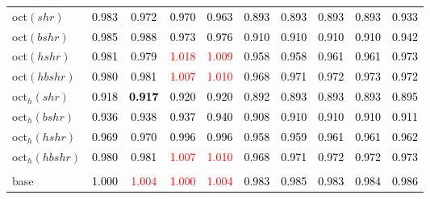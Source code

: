 \begin{tabular}[t]{>{\centering\arraybackslash}m{2.5cm}ccccccccc}
oct$(shr)$ & \textcolor{black}{0.983} & \textcolor{black}{0.972} & \textcolor{black}{0.970} & \textcolor{black}{0.963} & \textcolor{black}{0.893} & \textcolor{black}{0.893} & \textcolor{black}{0.893} & \textcolor{black}{0.893} & \textcolor{black}{0.933}\\
oct$(bshr)$ & \textcolor{black}{0.985} & \textcolor{black}{0.988} & \textcolor{black}{0.973} & \textcolor{black}{0.976} & \textcolor{black}{0.910} & \textcolor{black}{0.910} & \textcolor{black}{0.910} & \textcolor{black}{0.910} & \textcolor{black}{0.942}\\
oct$(hshr)$ & \textcolor{black}{0.981} & \textcolor{black}{0.979} & \textcolor{red}{1.018} & \textcolor{red}{1.009} & \textcolor{black}{0.958} & \textcolor{black}{0.958} & \textcolor{black}{0.961} & \textcolor{black}{0.961} & \textcolor{black}{0.973}\\
oct$(hbshr)$ & \textcolor{black}{0.980} & \textcolor{black}{0.981} & \textcolor{red}{1.007} & \textcolor{red}{1.010} & \textcolor{black}{0.968} & \textcolor{black}{0.971} & \textcolor{black}{0.972} & \textcolor{black}{0.973} & \textcolor{black}{0.972}\\
oct$_h(shr)$ & \textcolor{black}{0.918} & \textcolor{black}{\textbf{0.917}} & \textcolor{black}{0.920} & \textcolor{black}{0.920} & \textcolor{black}{0.892} & \textcolor{black}{0.893} & \textcolor{black}{0.893} & \textcolor{black}{0.893} & \textcolor{black}{0.895}\\
oct$_h(bshr)$ & \textcolor{black}{0.936} & \textcolor{black}{0.938} & \textcolor{black}{0.937} & \textcolor{black}{0.940} & \textcolor{black}{0.908} & \textcolor{black}{0.910} & \textcolor{black}{0.910} & \textcolor{black}{0.910} & \textcolor{black}{0.911}\\
oct$_h(hshr)$ & \textcolor{black}{0.969} & \textcolor{black}{0.970} & \textcolor{black}{0.996} & \textcolor{black}{0.996} & \textcolor{black}{0.958} & \textcolor{black}{0.959} & \textcolor{black}{0.961} & \textcolor{black}{0.961} & \textcolor{black}{0.962}\\
oct$_h(hbshr)$ & \textcolor{black}{0.980} & \textcolor{black}{0.981} & \textcolor{red}{1.007} & \textcolor{red}{1.010} & \textcolor{black}{0.968} & \textcolor{black}{0.971} & \textcolor{black}{0.972} & \textcolor{black}{0.972} & \textcolor{black}{0.973}\\
\addlinespace[0.3em]
\multicolumn{10}{c}{\textbf{$k = 1$}}\\
base & \textcolor{black}{1.000} & \textcolor{red}{1.004} & \textcolor{red}{1.000} & \textcolor{red}{1.004} & \textcolor{black}{0.983} & \textcolor{black}{0.985} & \textcolor{black}{0.983} & \textcolor{black}{0.984} & \textcolor{black}{0.986}\\

\end{tabular}
